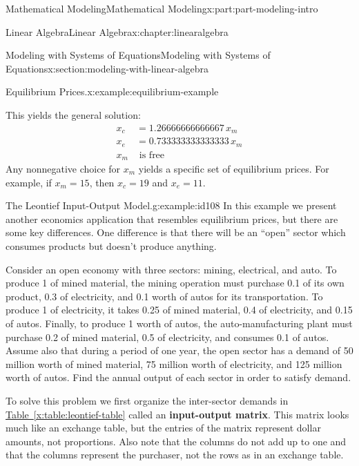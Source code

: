 \documentclass[oneside,10pt,]{book}
\newcommand{\xreffont}{\relax}
\newcommand{\terminology}[1]{\textbf{#1}}
\numberwithin{equation}{section}
\begin{document}
\begin{partptx}{Mathematical Modeling}{}{Mathematical Modeling}{}{}{x:part:part-modeling-intro}
\begin{chapterptx}{Linear Algebra}{}{Linear Algebra}{}{}{x:chapter:linearalgebra}
\begin{sectionptx}{Modeling with Systems of Equations}{}{Modeling with Systems of Equations}{}{}{x:section:modeling-with-linear-algebra}
\begin{example}{Equilibrium Prices.}{x:example:equilibrium-example}
\begin{sageoutput}
[ 0.000000000000000   1.00000000000000 -0.733333333333333  0.000000000000000]
[ 0.000000000000000  0.000000000000000  0.000000000000000  0.000000000000000]
\end{sageoutput}
This yields the general solution:%
%
\begin{equation*}
\begin{aligned}
x_c & = 1.26666666666667\,x_m \\
x_e & = 0.733333333333333\, x_m \\
x_m & \text{ is free}
\end{aligned}
\end{equation*}
Any nonnegative choice for \(x_m\) yields a specific set of equilibrium prices. For example, if \(x_m = 15\), then \(x_c = 19\) and \(x_e = 11\).%
\end{example}
\begin{example}{The Leontief Input-Output Model.}{g:example:id108}%
In this example we present another economics application that resembles equilibrium prices, but there are some key differences. One difference is that there will be an ``open'' sector which consumes products but doesn't produce anything.%
\par
Consider an open economy with three sectors: mining, electrical, and auto. To produce \textdollar{}1 of mined material, the mining operation must purchase \textdollar{}0.1 of its own product, \textdollar{}0.3 of electricity, and \textdollar{}0.1 worth of autos for its transportation. To produce \textdollar{}1 of electricity, it takes \textdollar{}0.25 of mined material, \textdollar{}0.4 of electricity, and \textdollar{}0.15 of autos. Finally, to produce \textdollar{}1 worth of autos, the auto-manufacturing plant must purchase \textdollar{}0.2 of mined material, \textdollar{}0.5 of electricity, and consumes \textdollar{}0.1 of autos. Assume also that during a period of one year, the open sector has a demand of \textdollar{}50 million worth of mined material, \textdollar{}75 million worth of electricity, and \textdollar{}125 million worth of autos. Find the annual output of each sector in order to satisfy demand.%
\par
To solve this problem we first organize the inter-sector demands in \hyperref[x:table:leontief-table]{Table~{\xreffont\ref{x:table:leontief-table}}} called an \terminology{input-output matrix}. This matrix looks much like an exchange table, but the entries of the matrix represent dollar amounts, not proportions. Also note that the columns do not add up to one and that the columns represent the purchaser, not the rows as in an exchange table.%

\end{example}
\end{sectionptx}
\end{chapterptx}
\end{partptx}
\end{document}
